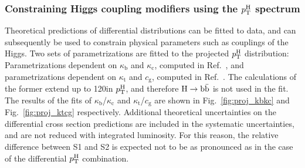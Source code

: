 

\subsubsection{Constraining Higgs coupling modifiers using the \texorpdfstring{$p_\mathrm{T}^\mathrm{H}$}{pTH} spectrum}

Theoretical predictions of differential distributions can be fitted to data, and can subsequently be used to constrain physical parameters such as couplings of the Higgs.
% 
Two sets of parametrizations are fitted to the projected $p_\mathrm{T}^\mathrm{H}$ distribution: 
% 
Parametrizations dependent on $\kappa_\textrm{b}$ and $\kappa_\textrm{c}$, computed in Ref.~\cite{Bishara:2016jga}, and parametrizations dependent on $\kappa_\textrm{t}$ and $c_\textrm{g}$, computed in Ref.~\cite{Grazzini:2017szg,Grazzini:2016paz}.
% 
The calculations of the former extend up to 120\GeV in $p_\mathrm{T}^\mathrm{H}$, and therefore $\mathrm{H}\to\mathrm{b}\bar{\mathrm{b}}$ is not used in the fit.
% 
The results of the fits of $\kappa_\textrm{b}$/$\kappa_\textrm{c}$ and $\kappa_\textrm{t}$/$c_\textrm{g}$ are shown in Fig.~\ref{fig:proj_kbkc} and Fig.~\ref{fig:proj_ktcg} respectively.
% 
Additional theoretical uncertainties on the differential cross section predictions are included in the systematic uncertainties, and are not reduced with integrated luminosity.
% 
For this reason, the relative difference between S1 and S2 is expected not to be as pronounced as in the case of the differential $p_\mathrm{T}^\mathrm{H}$ combination.


